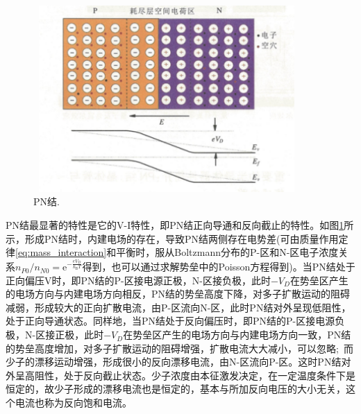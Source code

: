 \begin{figure}[h!]
\centering
\vspace*{-0.10in}
\includegraphics[height=2.80in,width=4.00in,viewport=0 0 90 66,clip]{Figures/P-N_node.png}
\caption{\small \textrm{PN结.}}%
\label{Fig:P-N_node}
\end{figure} 
PN结最显著的特性是它的V-I特性，即PN结正向导通和反向截止的特性。如图\ref{Fig:P-N_node}所示，形成PN结时，内建电场的存在，导致PN结两侧存在电势差(可由质量作用定律\eqref{eq:mass_interaction}和平衡时，服从Boltzmann分布的P-区和N-区电子浓度关系$n_{P0}/n_{N0}=\mathrm{e}^{-\frac{eV_D}{k_{\mathrm{B}}T}}$得到，也可以通过求解势垒中的Poisson方程得到)。当PN结处于正向偏压V时，即PN结的P-区接电源正极，N-区接负极，此时$-V_D$在势垒区产生的电场方向与内建电场方向相反，PN结的势垒高度下降，对多子扩散运动的阻碍减弱，形成较大的正向扩散电流，由P-区流向N-区，此时PN结对外呈现低阻性，处于正向导通状态。同样地，当PN结处于反向偏压时，即PN结的P-区接电源负极，N-区接正极，此时$-V_D$在势垒区产生的电场方向与内建电场方向一致，PN结的势垒高度增加，对多子扩散运动的阻碍增强，扩散电流大大减小，可以忽略;~而少子的漂移运动增强，形成很小的反向漂移电流，由N-区流向P-区。这时PN结对外呈高阻性，处于反向截止状态。少子浓度由本征激发决定，在一定温度条件下是恒定的，故少子形成的漂移电流也是恒定的，基本与所加反向电压的大小无关，这个电流也称为反向饱和电流。


